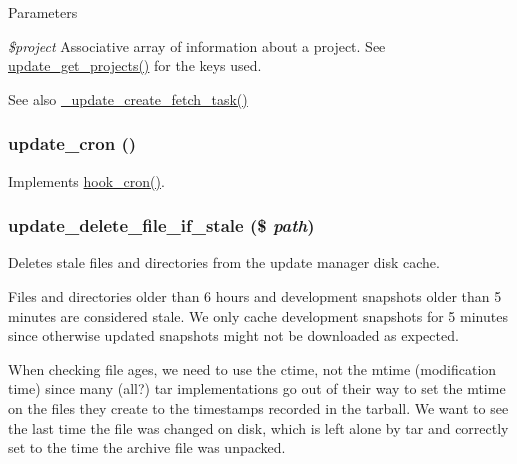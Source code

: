 \begin{DoxyParams}{Parameters}
\item[{\em \$project}]Associative array of information about a project. See \hyperlink{update_8compare_8inc_a7e1ea49d91f2d2b81b8101d481d10300}{update\_\-get\_\-projects()} for the keys used.\end{DoxyParams}
\begin{DoxySeeAlso}{See also}
\hyperlink{update_8fetch_8inc_a8b22762aaa27e7a0927f4f3ad09ad5e1}{\_\-update\_\-create\_\-fetch\_\-task()} 
\end{DoxySeeAlso}
\hypertarget{update_8module_aa03db4586231db9f453bd156d3b1f242}{
\subsubsection[{update\_\-cron}]{\setlength{\rightskip}{0pt plus 5cm}update\_\-cron ()}}
\label{update_8module_aa03db4586231db9f453bd156d3b1f242}
Implements \hyperlink{group__hooks_gaf07f1e3d98112fc2ba6920cf7ee6fb16}{hook\_\-cron()}. \hypertarget{update_8module_a22563c9c7f601f21fe7d2dc89aa73e2e}{
\subsubsection[{update\_\-delete\_\-file\_\-if\_\-stale}]{\setlength{\rightskip}{0pt plus 5cm}update\_\-delete\_\-file\_\-if\_\-stale (\$ {\em path})}}
\label{update_8module_a22563c9c7f601f21fe7d2dc89aa73e2e}
Deletes stale files and directories from the update manager disk cache.

Files and directories older than 6 hours and development snapshots older than 5 minutes are considered stale. We only cache development snapshots for 5 minutes since otherwise updated snapshots might not be downloaded as expected.

When checking file ages, we need to use the ctime, not the mtime (modification time) since many (all?) tar implementations go out of their way to set the mtime on the files they create to the timestamps recorded in the tarball. We want to see the last time the file was changed on disk, which is left alone by tar and correctly set to the time the archive file was unpacked.


